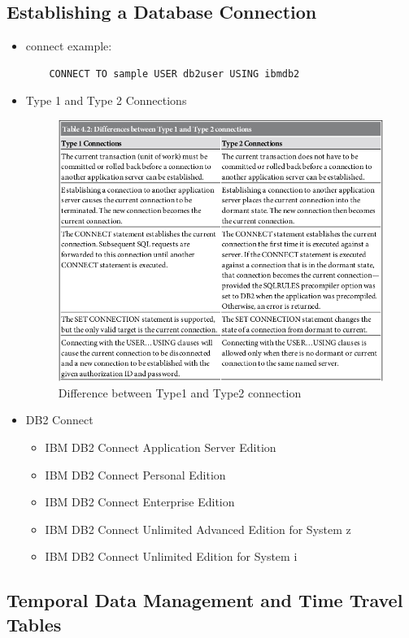 \documentclass{article}
\begin{document}
\subsection{Establishing a Database Connection}
\begin{itemize}
\item connect example:
	\begin{verbatim}
	CONNECT TO sample USER db2user USING ibmdb2
	\end{verbatim}
\item Type 1 and Type 2 Connections
	\begin{figure}[H]
	\centering
	\includegraphics[scale=0.6]{type-connection.png}
	\caption{Difference between Type1 and Type2 connection}
	\end{figure}	
\item DB2 Connect
	\begin{itemize}
	\item IBM DB2 Connect Application Server Edition
	\item IBM DB2 Connect Personal Edition
	\item IBM DB2 Connect Enterprise Edition
	\item IBM DB2 Connect Unlimited Advanced Edition for System z
	\item IBM DB2 Connect Unlimited Edition for System i
	\end{itemize}
\end{itemize}

\newpage
\subsection{Temporal Data Management and Time Travel Tables}
\end{document}
